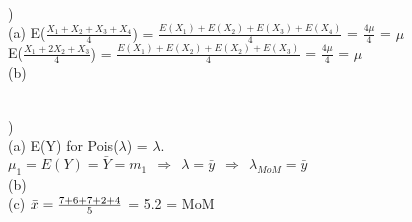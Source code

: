 \documentclass[12pt]{article}
\begin{document}
\noindent \hrulefill \\


)\\
\indent (a) E({\Large{$\frac{X_1+X_2+X_3+X_4}{4}$}) = $\frac{E(X_1)+E(X_2)+E(X_3)+E(X_4)}{4}$} = {\Large $\frac{4\mu}{4}$} = $\mu$\\[.4em]
\indent \indent E({\Large{$\frac{X_1+2X_2+X_3}{4}$}) = $\frac{E(X_1)+E(X_2)+E(X_2)+E(X_3)}{4}$} = {\Large $\frac{4\mu}{4}$} = $\mu$\\[.4em]

\indent (b) 


\noindent \hrulefill \\


) \\
\indent (a) E(Y) for Pois($\lambda$) = $\lambda$. \\
\indent \indent $\mu_1 = E(Y) = \bar{Y} = m_1 \ \ \Rightarrow \ \ \lambda = \bar{y} \ \ \Rightarrow\ \  \lambda_{MoM} = \bar{y}$\\

\indent (b)\\

\indent (c) $\bar{x} = {\Large\frac{7 + 6 + 7 + 2 + 4}{5}}$ = 5.2 = MoM\\
\indent \indent 
\end{document}
